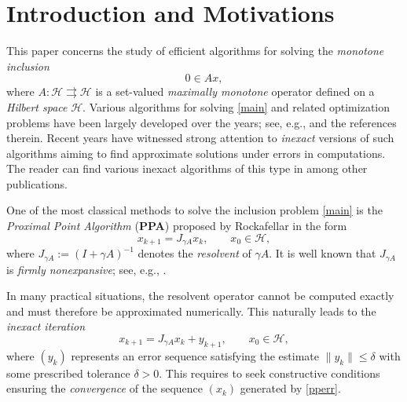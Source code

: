 \documentclass[12pt]{article}
\theoremstyle{plain}
\begin{document}
\section{Introduction and Motivations}

This paper concerns the study of efficient algorithms {for solving} the {\it monotone inclusion} 
\begin{equation}\label{main}
0\in Ax,
\end{equation}
where $A:\mathcal{H}\rightrightarrows \mathcal{H}$ is a set-valued {\it maximally monotone} operator defined on a {\it Hilbert space} $\mathcal{H}$. Various algorithms for solving \eqref{main} and related optimization problems have been largely developed over the years; see, e.g.,  \cite{Bauschke,Nesterov,Reich,Rockafellar,tseng} and the references therein. Recent years have witnessed strong attention to {\it inexact} versions of such algorithms aiming to find approximate solutions under errors in computations. The reader can find various inexact algorithms of this type in \cite{Buscaglia,Butnariu,
dev-nest,KLMT,KMT24,KMT26,KMT,L1,LMT,LT,Rz1,Rz2} among other publications.

One of the most classical methods to solve the inclusion problem \eqref{main} is the {\it Proximal Point Algorithm} (\textbf{PPA}) proposed by Rockafellar \cite{Rockafellar} in the form
\begin{equation*}
x_{k+1}=J_{\gamma A}x_k,\qquad x_0\in \mathcal{H},
\end{equation*}
where $J_{\gamma A}:=(I+\gamma A)^{-1}$ denotes the {\it resolvent} of $\gamma A$. It is well known that $J_{\gamma A}$ is {\it firmly nonexpansive}; see, e.g., \cite{Bauschke,Bruck,Goebel,Nesterov,Rockafellar}.

In many practical situations, the resolvent operator cannot be computed exactly and must therefore be approximated numerically. This naturally leads to the {\it inexact iteration}
\begin{equation}\label{pperr}
x_{k+1}=J_{\gamma A}x_k+y_{k+1},\qquad x_0\in \mathcal{H},
\end{equation}
where $(y_k)$ represents an error sequence satisfying the estimate
$\|y_k\|\leq \delta$ with some prescribed tolerance $\delta>0$. This requires to seek constructive conditions ensuring the {\it convergence} of the sequence $(x_k)$ generated by \eqref{pperr}.
\end{document}
